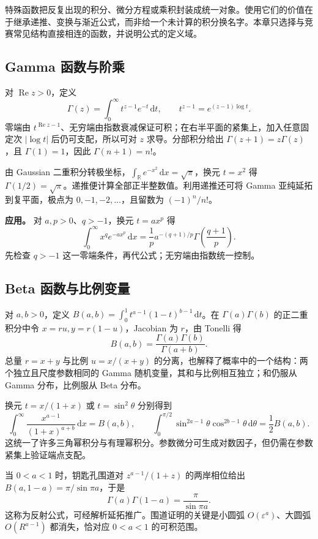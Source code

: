 \documentclass[UTF8,12pt,a4paper,fontset=fandol]{ctexart}
\begin{document}
特殊函数把反复出现的积分、微分方程或乘积封装成统一对象。使用它们的价值在于继承递推、变换与渐近公式，而非给一个未计算的积分换名字。本章只选择与竞赛常见结构直接相连的函数，并说明公式的定义域。

\subsection{Gamma 函数与阶乘}

\label{app:special-gamma}

对 $\operatorname{Re}z>0$，定义
\[
\Gamma(z)=\int_0^\infty t^{z-1}e^{-t}\,\mathrm dt,
\qquad t^{z-1}=e^{(z-1)\log t}.
\]
零端由 $t^{\operatorname{Re}z-1}$、无穷端由指数衰减保证可积；在右半平面的紧集上，加入任意固定次 $|\log t|$ 后仍可支配，所以可对 $z$ 求导。分部积分给出 $\Gamma(z+1)=z\Gamma(z)$，且 $\Gamma(1)=1$，因此 $\Gamma(n+1)=n!$。

由 Gaussian 二重积分转极坐标，$\int_{\mathbb R}e^{-x^2}\,\mathrm dx=\sqrt\pi$，换元 $t=x^2$ 得 $\Gamma(1/2)=\sqrt\pi$。递推便计算全部正半整数值。利用递推还可将 Gamma 亚纯延拓到复平面，极点为 $0,-1,-2,\ldots$，且留数为 $(-1)^n/n!$。

\textbf{应用。} 对 $a,p>0$、$q>-1$，换元 $t=ax^p$ 得
\[
\int_0^\infty x^qe^{-ax^p}\,\mathrm dx
=\frac1p a^{-(q+1)/p}\Gamma\!\left(\frac{q+1}{p}\right).
\]
先检查 $q>-1$ 这一零端条件，再代公式；无穷端由指数统一控制。

\subsection{Beta 函数与比例变量}

\label{app:special-beta}

对 $a,b>0$，定义 $B(a,b)=\int_0^1t^{a-1}(1-t)^{b-1}\,\mathrm dt$。在 $\Gamma(a)\Gamma(b)$ 的正二重积分中令 $x=ru,y=r(1-u)$，Jacobian 为 $r$，由 Tonelli 得
\[
B(a,b)=\frac{\Gamma(a)\Gamma(b)}{\Gamma(a+b)}.
\]
总量 $r=x+y$ 与比例 $u=x/(x+y)$ 的分离，也解释了概率中的一个结构：两个独立且尺度参数相同的 Gamma 随机变量，其和与比例相互独立；和仍服从 Gamma 分布，比例服从 Beta 分布。

换元 $t=x/(1+x)$ 或 $t=\sin^2\theta$ 分别得到
\[
\int_0^\infty\frac{x^{a-1}}{(1+x)^{a+b}}\,\mathrm dx=B(a,b),
\qquad
\int_0^{\pi/2}\sin^{2a-1}\theta\cos^{2b-1}\theta\,\mathrm d\theta=\frac12B(a,b).
\]
这统一了许多三角幂积分与有理幂积分。参数微分可生成对数因子，但仍需在参数紧集上验证端点支配。

当 $0<a<1$ 时，钥匙孔围道对 $z^{a-1}/(1+z)$ 的两岸相位给出 $B(a,1-a)=\pi/\sin\pi a$，于是
\[
\Gamma(a)\Gamma(1-a)=\frac\pi{\sin\pi a}.
\]
这称为反射公式，可经解析延拓推广。围道证明的关键是小圆弧 $O(\varepsilon^a)$、大圆弧 $O(R^{a-1})$ 都消失，恰对应 $0<a<1$ 的可积范围。
\end{document}
